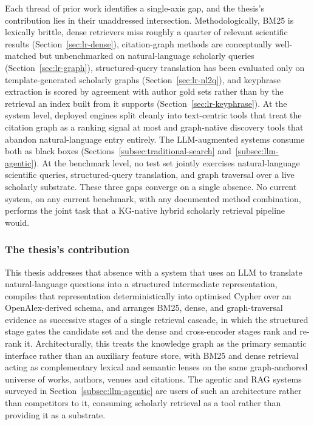 Each thread of prior work identifies a single-axis gap, and the thesis's
contribution lies in their unaddressed intersection.  Methodologically,
BM25 is lexically brittle, dense retrievers miss roughly a quarter of
relevant scientific results (Section~\ref{sec:lr-dense}), citation-graph
methods are conceptually well-matched but unbenchmarked on
natural-language scholarly queries (Section~\ref{sec:lr-graph}),
structured-query translation has been evaluated only on
template-generated scholarly graphs (Section~\ref{sec:lr-nl2q}), and
keyphrase extraction is scored by agreement with author gold sets rather
than by the retrieval an index built from it supports
(Section~\ref{sec:lr-keyphrase}).  At the
system level, deployed engines split cleanly into text-centric tools
that treat the citation graph as a ranking signal at most and
graph-native discovery tools that abandon natural-language entry
entirely.  The LLM-augmented systems consume both as black boxes
(Sections~\ref{subsec:traditional-search}
and~\ref{subsec:llm-agentic}).
At the benchmark level, no test set jointly exercises natural-language
scientific queries, structured-query translation, and graph traversal
over a live scholarly substrate.  These three gaps converge on a single
absence.  No current system, on any current benchmark, with any
documented method combination, performs the joint task that a KG-native
hybrid scholarly retrieval pipeline would. \\

\subsubsection{The thesis's contribution}

This thesis addresses that absence with a system that uses an LLM to
translate natural-language questions into a structured intermediate
representation, compiles that representation deterministically into
optimised Cypher over an OpenAlex-derived schema, and arranges BM25,
dense, and graph-traversal evidence as successive stages of a single
retrieval cascade, in which the structured stage gates the candidate set
and the dense and cross-encoder stages rank and re-rank it.  
Architecturally, this treats the knowledge graph as the
primary semantic interface rather than an auxiliary feature store, with
BM25 and dense retrieval acting as complementary lexical and semantic
lenses on the same graph-anchored universe of works, authors, venues and
citations.  The agentic and RAG systems surveyed in
Section~\ref{subsec:llm-agentic} are users of such an architecture rather
than competitors to it, consuming scholarly retrieval as a tool rather
than providing it as a substrate.